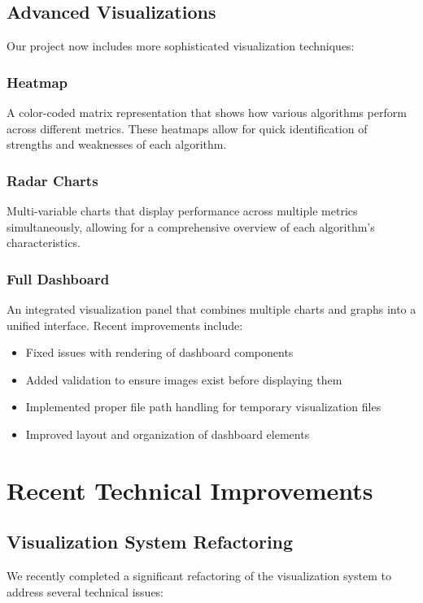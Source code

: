 \documentclass[12pt,a4paper]{article}
\begin{document}
\subsection{Advanced Visualizations}
Our project now includes more sophisticated visualization techniques:

\subsubsection{Heatmap}
A color-coded matrix representation that shows how various algorithms perform across different metrics. These heatmaps allow for quick identification of strengths and weaknesses of each algorithm.

\subsubsection{Radar Charts}
Multi-variable charts that display performance across multiple metrics simultaneously, allowing for a comprehensive overview of each algorithm's characteristics.

\subsubsection{Full Dashboard}
An integrated visualization panel that combines multiple charts and graphs into a unified interface. Recent improvements include:
\begin{itemize}
    \item Fixed issues with rendering of dashboard components
    \item Added validation to ensure images exist before displaying them
    \item Implemented proper file path handling for temporary visualization files
    \item Improved layout and organization of dashboard elements
\end{itemize}

\section{Recent Technical Improvements}
\subsection{Visualization System Refactoring}
We recently completed a significant refactoring of the visualization system to address several technical issues:
\end{document}
